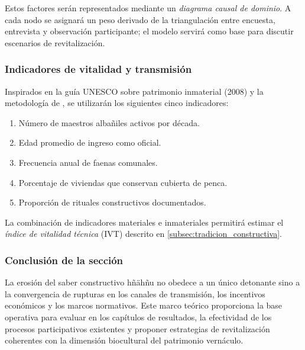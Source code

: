 Estos factores serán representados mediante un \emph{diagrama causal de
	dominio}.  A cada nodo se asignará un peso derivado de la triangulación
entre encuesta, entrevista y observación participante; el modelo
servirá como base para discutir escenarios de revitalización.

\subsubsection{Indicadores de vitalidad y transmisión}

Inspirados en la guía UNESCO sobre patrimonio inmaterial (2008) y la
metodología de \cite{gandara2000}, se utilizarán los siguientes cinco
indicadores:

\begin{enumerate}
	\item Número de maestros albañiles activos por década.
	\item Edad promedio de ingreso como oficial.
	\item Frecuencia anual de faenas comunales.
	\item Porcentaje de viviendas que conservan cubierta de penca.
	\item Proporción de rituales constructivos documentados.
\end{enumerate}

La combinación de indicadores materiales e inmateriales permitirá
estimar el \emph{índice de vitalidad técnica} (IVT) descrito en
\autoref{subsec:tradicion_constructiva}.

\subsubsection{Conclusión de la sección}

La erosión del saber constructivo hñähñu no obedece a un único detonante
sino a la convergencia de rupturas en los canales de transmisión, los
incentivos económicos y los marcos normativos.  Este marco teórico
proporciona la base operativa para evaluar en los capítulos de
resultados, la efectividad de los procesos participativos existentes y
proponer estrategias de revitalización coherentes con la dimensión
biocultural del patrimonio vernáculo.


